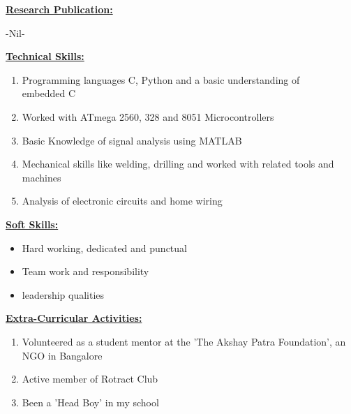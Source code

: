 \documentclass[10pt]{article}
\begin{document}
	\hfill 
	
	\underline{\textbf{\Large{Research Publication:}}}
	\begin{enumerate}
		-Nil-
	\end{enumerate}

	\hfill
	
	\underline{\textbf{\Large{Technical Skills:}}}
	\begin{enumerate}
		\item{Programming languages C, Python and a basic understanding of \\embedded C}
		\item{Worked with ATmega 2560, 328 and 8051 Microcontrollers}
		\item {Basic Knowledge of signal analysis using MATLAB}
		\item{Mechanical skills like welding, drilling and worked with related tools and machines}
		\item{Analysis of electronic circuits and home wiring}
	\end{enumerate}
	
	\vspace{3cm}
	\hfill 
	\hfill
	
	\underline{\textbf{\Large{Soft Skills:}}}
	\begin{itemize}
		\item{Hard working, dedicated and punctual}
		\item{Team work and responsibility}
		\item{leadership qualities} 
	\end{itemize}
	
	\hfill
	
	\underline{\textbf{\Large{Extra-Curricular Activities:}}}
	\begin{enumerate}
		\item{Volunteered as a student mentor at the 'The Akshay Patra Foundation', an NGO in Bangalore}
		\item {Active member of Rotract Club}
		\item{Been a 'Head Boy' in my school}	
	\end{enumerate}
	
\end{document}
